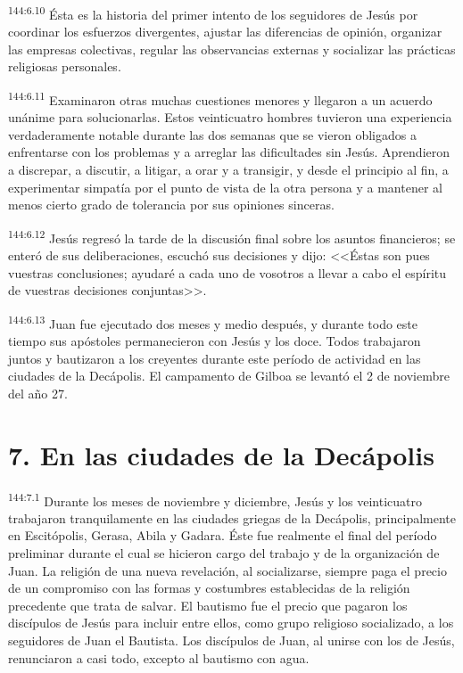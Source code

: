 \par 
\textsuperscript{144:6.10} Ésta es la historia del primer intento de los seguidores de Jesús por coordinar los esfuerzos divergentes, ajustar las diferencias de opinión, organizar las empresas colectivas, regular las observancias externas y socializar las prácticas religiosas personales.

\par 
\textsuperscript{144:6.11} Examinaron otras muchas cuestiones menores y llegaron a un acuerdo unánime para solucionarlas. Estos veinticuatro hombres tuvieron una experiencia verdaderamente notable durante las dos semanas que se vieron obligados a enfrentarse con los problemas y a arreglar las dificultades sin Jesús. Aprendieron a discrepar, a discutir, a litigar, a orar y a transigir, y desde el principio al fin, a experimentar simpatía por el punto de vista de la otra persona y a mantener al menos cierto grado de tolerancia por sus opiniones sinceras.

\par 
\textsuperscript{144:6.12} Jesús regresó la tarde de la discusión final sobre los asuntos financieros; se enteró de sus deliberaciones, escuchó sus decisiones y dijo: <<Éstas son pues vuestras conclusiones; ayudaré a cada uno de vosotros a llevar a cabo el espíritu de vuestras decisiones conjuntas>>.

\par 
\textsuperscript{144:6.13} Juan fue ejecutado dos meses y medio después, y durante todo este tiempo sus apóstoles permanecieron con Jesús y los doce. Todos trabajaron juntos y bautizaron a los creyentes durante este período de actividad en las ciudades de la Decápolis. El campamento de Gilboa se levantó el 2 de noviembre del año 27.

\section*{7. En las ciudades de la Decápolis}
\par 
\textsuperscript{144:7.1} Durante los meses de noviembre y diciembre, Jesús y los veinticuatro trabajaron tranquilamente en las ciudades griegas de la Decápolis, principalmente en Escitópolis, Gerasa, Abila y Gadara. Éste fue realmente el final del período preliminar durante el cual se hicieron cargo del trabajo y de la organización de Juan. La religión de una nueva revelación, al socializarse, siempre paga el precio de un compromiso con las formas y costumbres establecidas de la religión precedente que trata de salvar. El bautismo fue el precio que pagaron los discípulos de Jesús para incluir entre ellos, como grupo religioso socializado, a los seguidores de Juan el Bautista. Los discípulos de Juan, al unirse con los de Jesús, renunciaron a casi todo, excepto al bautismo con agua.

